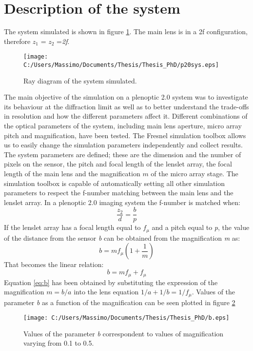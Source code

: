\section{Description of the system}
\label{sec:descrSYS20}
The system simulated is shown in figure \ref{fig:sys}. The main lens is in a 2f configuration, therefore $z_1$ = $z_2$ =\textit{2f}.
\begin{figure}[H]
	\centering
	\texttt{[image: C:/Users/Massimo/Documents/Thesis/Thesis\_PhD/p20sys.eps]}
	\caption{\label{fig:sys} Ray diagram of the system simulated.  }
\end{figure}
The main objective of the simulation on a plenoptic 2.0 system was to investigate its behaviour at the diffraction limit as well as to better understand the trade-offs in resolution and how the different parameters affect it. Different combinations of the optical parameters of the system, including main lens aperture, micro array pitch and magnification,  have been tested. The Fresnel simulation toolbox allows us to easily change the simulation parameters independently and collect results.
The system parameters are defined; these are the  dimension and the number of pixels on the sensor, the pitch and focal length of the lenslet array, the focal length of the main lens and the magnification $m$ of the micro array stage. The simulation toolbox is capable of automatically setting all other simulation parameters to respect the f-number matching between the main lens and the lenslet array. In a plenoptic 2.0 imaging system the f-number is matched when:
\begin{equation}
\label{eq:fmatch20}
\dfrac{z_2}{d}=\dfrac{b}{p}
\end{equation}
If the lenslet array has a focal length equal to $f_{\mu}$ and a pitch equal to \textit{p}, the value of the distance from the sensor \textit{b} can be obtained from the magnification \textit{m} as:
\begin{equation}
\label{eq:b}
b = mf_{\mu} \left(1+\dfrac{1}{m}\right)
\end{equation} 
That becomes the linear relation:
\begin{equation}
\label{eq:b1}
b = mf_{\mu}+f_{\mu}
\end{equation} 
Equation \ref{eq:b} has been obtained by substituting the expression of the magnification $m=b/a$ into the lens equation $1/a+1/b=1/f_{\mu}$.
Values of the parameter \textit{b} as a function of the magnification can be seen plotted in figure \ref{fig:b}
\begin{figure}[H]
	\centering
	\texttt{[image: C:/Users/Massimo/Documents/Thesis/Thesis\_PhD/b.eps]}
	\caption{\label{fig:b} Values of the parameter \textit{b} correspondent to values of magnification varying from 0.1 to 0.5.}
\end{figure}
